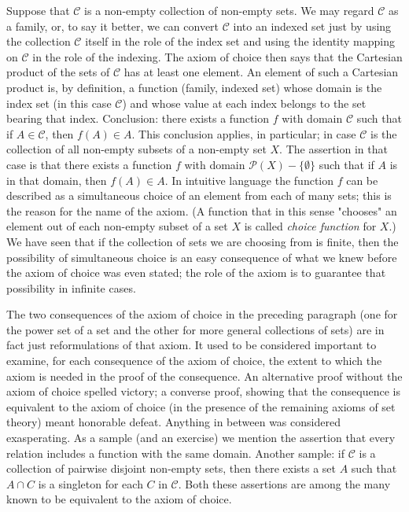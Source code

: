 Suppose that $\mathcal{C}$ is a non-empty collection of non-empty sets. We may regard $\mathcal{C}$ as a family, or, to say it better, we can convert $\mathcal{C}$ into an indexed set just by using the collection $\mathcal{C}$ itself in the role of the index set and using the identity mapping on $\mathcal{C}$ in the role of the indexing. The axiom of choice then says that the Cartesian product of the sets of $\mathcal{C}$ has at least one element. An element of such a Cartesian product is, by definition, a function (family, indexed set) whose domain is the index set (in this case $\mathcal{C}$) and whose value at each index belongs to the set bearing that index. Conclusion: there exists a function $f$ with domain $\mathcal{C}$ such that if $A \in \mathcal{C}$, then $f(A) \in A$. This conclusion applies, in particular; in case $\mathcal{C}$ is the collection of all non-empty subsets of a non-empty set $X$. The assertion in that case is that there exists a function $f$ with domain $\mathcal{P}(X) - \{ \emptyset \}$ such that if $A$ is in that domain, then $f(A) \in A$. In intuitive language the function $f$ can be described as a simultaneous choice of an element from each of many sets; this is the reason for the name of the axiom. (A function that in this sense "chooses" an element out of each non-empty subset of a set $X$ is called \textit{choice function} for $X$.) We have seen that if the collection of sets we are choosing from is finite, then the possibility of simultaneous choice is an easy consequence of what we knew before the axiom of choice was even stated; the role of the axiom is to guarantee that possibility in infinite cases. 

The two consequences of the axiom of choice in the preceding paragraph (one for the power set of a set and the other for more general collections of sets) are in fact just reformulations of that axiom. It used to be considered important to examine, for each consequence of the axiom of choice, the extent to which the axiom is needed in the proof of the consequence. An alternative proof without the axiom of choice spelled victory; a converse proof, showing that the consequence is equivalent to the axiom of choice (in the presence of the remaining axioms of set theory) meant honorable defeat. Anything in between was considered exasperating. As a sample (and an exercise) we mention the assertion that every relation includes a function with the same domain. Another sample: if $\mathcal{C}$ is a collection of pairwise disjoint non-empty sets, then there exists a set $A$ such that $A \cap C$ is a singleton for each $C$ in $\mathcal{C}$. Both these assertions are among the many known to be equivalent to the axiom of choice. 

